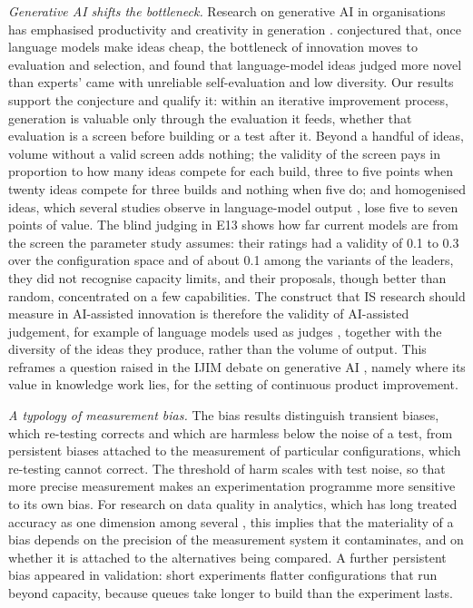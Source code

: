 \documentclass[preprint,12pt,authoryear]{elsarticle}
\theoremstyle{definition}
\begin{document}
\emph{Generative AI shifts the bottleneck.} Research on generative AI in organisations has emphasised productivity and creativity in generation \citep{noy2023, dellacqua2023, girotra2023, boussioux2024, dwivedi2023}. \citet{girotra2023} conjectured that, once language models make ideas cheap, the bottleneck of innovation moves to evaluation and selection, and \citet{si2025} found that language-model ideas judged more novel than experts' came with unreliable self-evaluation and low diversity. Our results support the conjecture and qualify it: within an iterative improvement process, generation is valuable only through the evaluation it feeds, whether that evaluation is a screen before building or a test after it. Beyond a handful of ideas, volume without a valid screen adds nothing; the validity of the screen pays in proportion to how many ideas compete for each build, three to five points when twenty ideas compete for three builds and nothing when five do; and homogenised ideas, which several studies observe in language-model output \citep{doshi2024, anderson2024, meincke2024}, lose five to seven points of value. The blind judging in E13 shows how far current models are from the screen the parameter study assumes: their ratings had a validity of 0.1 to 0.3 over the configuration space and of about 0.1 among the variants of the leaders, they did not recognise capacity limits, and their proposals, though better than random, concentrated on a few capabilities. The construct that IS research should measure in AI-assisted innovation is therefore the validity of AI-assisted judgement, for example of language models used as judges \citep{zheng2023}, together with the diversity of the ideas they produce, rather than the volume of output. This reframes a question raised in the IJIM debate on generative AI \citep{dwivedi2023}, namely where its value in knowledge work lies, for the setting of continuous product improvement.

\emph{A typology of measurement bias.} The bias results distinguish transient biases, which re-testing corrects and which are harmless below the noise of a test, from persistent biases attached to the measurement of particular configurations, which re-testing cannot correct. The threshold of harm scales with test noise, so that more precise measurement makes an experimentation programme more sensitive to its own bias. For research on data quality in analytics, which has long treated accuracy as one dimension among several \citep{wang1996}, this implies that the materiality of a bias depends on the precision of the measurement system it contaminates, and on whether it is attached to the alternatives being compared. A further persistent bias appeared in validation: short experiments flatter configurations that run beyond capacity, because queues take longer to build than the experiment lasts.
\end{document}
